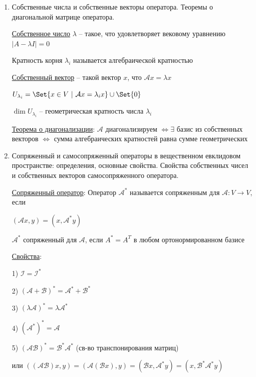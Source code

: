 \documentclass[12pt]{article}
\begin{document}
\begin{enumerate}
        \item Собственные числа и собственные векторы оператора. Теоремы о диагональной матрице оператора.

        \hyperlink{eigenvalue}{Собственное число} $\lambda$ -- такое, что удовлетворяет вековому уравнению $|A - \lambda I| = 0$

        Кратность корня $\lambda_i$ называется алгебраической кратностью

        \hyperlink{eigenvector}{Собственный вектор} -- такой вектор $x$, что $\mathcal{A}x = \lambda x$

        $U_{\lambda_i} = \Set{x \in V \ | \ \mathcal{A}x = \lambda_i x} \union \Set{0}$

        $\dim U_{\lambda_i}$ -- геометрическая кратность числа $\lambda_i$

        \hyperlink{diagonalizedmatrixtheorem}{Теорема о диагонализации}: $\mathcal{A}$ диагонализируем $\Longleftrightarrow \exists$ базис из собственных векторов $\Longleftrightarrow$ сумма алгебраических кратностей равна сумме геометрических

        \item Сопряженный и самосопряженный операторы в вещественном евклидовом пространстве: определения, основные свойства. Свойства собственных чисел и собственных векторов самосопряженного оператора.

        \hyperlink{conjugateoperator}{Сопряженный оператор}: Оператор $\mathcal{A}^*$ называется сопряженным для $\mathcal{A} : V \to V$, если

        $(\mathcal{A}x, y) = (x, \mathcal{A}^* y)$

        $\mathcal{A}^*$ сопряженный для $\mathcal{A}$, если $A^* = A^T$ в любом ортонормированном базисе

        \hyperlink{conjugateoperatorproperties}{Свойства}:

        1) $\mathcal{I} = \mathcal{I}^*$

        2) $(\mathcal{A} + \mathcal{B})^* = \mathcal{A}^* + \mathcal{B}^*$

        3) $(\lambda \mathcal{A})^* = \lambda \mathcal{A}^*$

        4) $(\mathcal{A}^*)^* = \mathcal{A}$

        5) $(\mathcal{A}\mathcal{B})^* = \mathcal{B}^* \mathcal{A}^*$ (св-во транспонирования матриц)

        или $((\mathcal{AB})x, y) = (\mathcal{A}(\mathcal{B}x), y) = (\mathcal{B}x, \mathcal{A}^* y) = (x, \mathcal{B}^* \mathcal{A}^* y)$


\end{enumerate}
\end{document}
